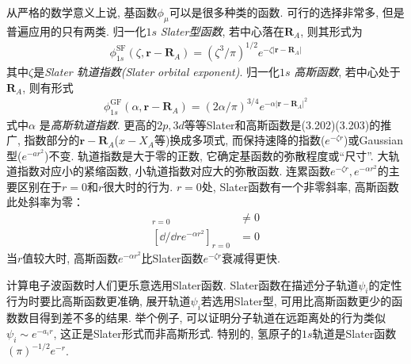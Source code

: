 从严格的数学意义上说, 基函数$\phi_\mu$可以是很多种类的函数. 可行的选择非常多, 但是普遍应用的只有两类. 归一化$1s$ \emph{Slater型函数}, 若中心落在$\mathbf{R}_A$, 则其形式为
\begin{align}
\phi_{1s}^\mathrm{SF}(\zeta,\mathbf{r-R}_A) = (\zeta^3/\pi)^{1/2}e^{-\zeta|\mathbf{r-R}_A|}
\end{align}
其中$\zeta$是\emph{Slater 轨道指数(Slater orbital exponent)}. 归一化$1s$ \emph{高斯函数}, 若中心处于$\mathbf{R}_A$, 则有形式
\begin{align}
\phi_{1s}^\mathrm{GF}(\alpha,\mathbf{r-R}_A) = (2\alpha/\pi)^{3/4}e^{-\alpha|\mathbf{r-R}_A|^2}
\end{align}
式中$\alpha$ 是\emph{高斯轨道指数}. 更高的$2p,3d$等等Slater和高斯函数是(3.202)(3.203)的推广, 指数部分的$\mathbf{r-R}_A$($x-X_A$等)换成多项式, 而保持速降的指数($e^{-\zeta r}$)或Gaussian型($e^{-ar^2}$)不变. 轨道指数是大于零的正数, 它确定基函数的弥散程度或``尺寸''. 大轨道指数对应小的紧缩函数, 小轨道指数对应大的弥散函数. 连累函数$e^{-\zeta r},e^{-\alpha r^2}$的主要区别在于$r=0$和$r$很大时的行为. $r=0$处, Slater函数有一个非零斜率, 高斯函数此处斜率为零：
\begin{align}
[\dd/\dd r e^{-\zeta r}]_{r=0}& \neq 0\\
[\dd/\dd r e^{-\alpha r^2}]_{r=0}&  =   0
\end{align}
当$r$值较大时, 高斯函数$e^{-\alpha r^2}$比Slater函数$e^{-\zeta r}$衰减得更快.

计算电子波函数时人们更乐意选用Slater函数. Slater函数在描述分子轨道$\psi_i$的定性行为时要比高斯函数更准确, 展开轨道$\psi_i$若选用Slater型, 可用比高斯函数更少的函数数目得到差不多的结果. 举个例子, 可以证明分子轨道在远距离处的行为类似$\psi_i\sim e^{-a_ir}$, 这正是Slater形式而非高斯形式. 特别的, 氢原子的$1s$轨道是Slater函数$(\pi)^{-1/2}e^{-r}$.

